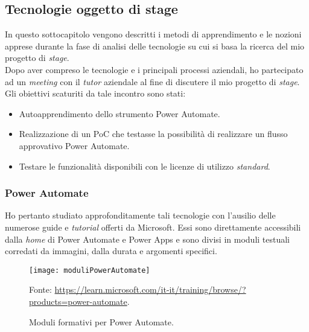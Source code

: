 \subsection{Tecnologie oggetto di stage}
In questo sottocapitolo vengono descritti i metodi di apprendimento e le nozioni apprese durante la fase di analisi delle tecnologie su cui si basa la ricerca del mio progetto di \emph{stage}.\\
Dopo aver compreso le tecnologie e i principali processi aziendali, ho partecipato ad un \emph{meeting} con il \emph{tutor} aziendale al fine di discutere il mio progetto di \emph{stage}.\\
Gli obiettivi scaturiti da tale incontro sono stati: 
\begin{itemize}
    \item Autoapprendimento dello strumento Power Automate.
    \item Realizzazione di un PoC che testasse la possibilità di realizzare un flusso approvativo Power Automate. 
    \item Testare le funzionalità disponibili con le licenze di utilizzo \emph{standard}. 
\end{itemize}

\subsubsection*{Power Automate}
Ho pertanto studiato approfonditamente tali tecnologie con l'ausilio delle numerose guide e \emph{tutorial} offerti da Microsoft. 
Essi sono direttamente accessibili dalla \emph{home} di Power Automate e Power Apps e sono divisi in moduli testuali corredati da immagini, dalla durata e argomenti specifici. 

\begin{figure}[htbp] 
    \centering 
    \texttt{[image: moduliPowerAutomate]} 
    \caption{Moduli formativi per Power Automate.}
    \label{fig:moduliPowerAutomate}
    \vspace{1mm}
    Fonte: \url{https://learn.microsoft.com/it-it/training/browse/?products=power-automate}.
\end{figure}

